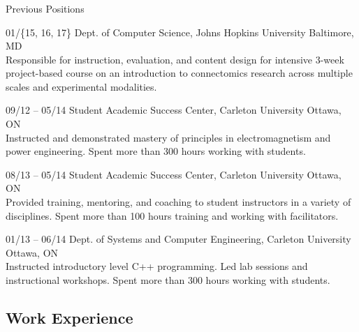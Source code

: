 \documentclass[]{friggeri-cv} %
\begin{document}
\subsubsection{}{Previous Positions}

\begin{entrylist}
\entry
{01/\{15, 16, 17\}}
{Dept. of Computer Science, Johns Hopkins University}
{Baltimore, MD}
{\\
Responsible for instruction, evaluation, and content design for intensive 3-week project-based course on an
introduction to connectomics research across multiple scales and experimental modalities.}

\entry
{09/12 -- 05/14}
{Student Academic Success Center, Carleton University}
{Ottawa, ON}
{\\
Instructed and demonstrated mastery of principles in electromagnetism and power engineering. Spent more than 300 hours
working with students.}

\entry
{08/13 -- 05/14}
{Student Academic Success Center, Carleton University}
{Ottawa, ON}
{\\
Provided training, mentoring, and coaching to student instructors in a variety of disciplines. Spent more than 100
hours training and working with facilitators.}

\entry
{01/13 -- 06/14}
{Dept. of Systems and Computer Engineering, Carleton University}
{Ottawa, ON}
{\\
Instructed introductory level C++ programming. Led lab sessions and instructional workshops. Spent more than 300 hours
working with students.}
\end{entrylist}

\subsection{Work Experience}
\end{document}

